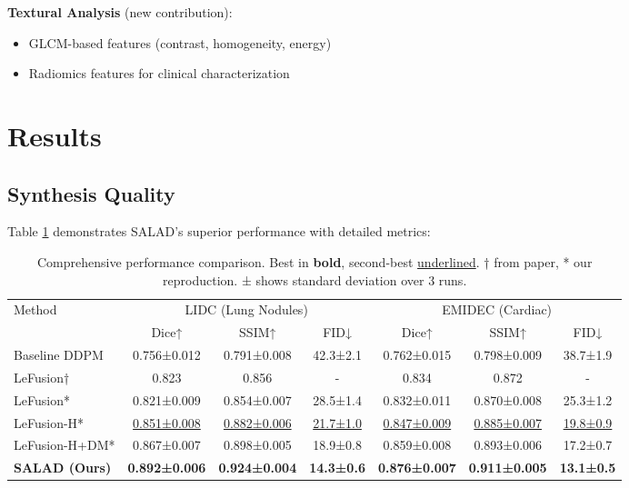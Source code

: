 \documentclass[10pt,twocolumn,letterpaper]{article}
\begin{document}
\textbf{Textural Analysis} (new contribution):
\begin{itemize}
    \item GLCM-based features (contrast, homogeneity, energy)
    \item Radiomics features for clinical characterization
\end{itemize}

\section{Results}

\subsection{Synthesis Quality}

Table \ref{tab:main_results} demonstrates SALAD's superior performance with detailed metrics:

\begin{table}[h]
\centering
\caption{Comprehensive performance comparison. Best in \textbf{bold}, second-best \underline{underlined}. † from paper, * our reproduction. ± shows standard deviation over 3 runs.}
\label{tab:main_results}
\small
\begin{tabular}{lcccccc}
\toprule
\multirow{2}{*}{Method} & \multicolumn{3}{c}{LIDC (Lung Nodules)} & \multicolumn{3}{c}{EMIDEC (Cardiac)} \\
\cmidrule(lr){2-4} \cmidrule(lr){5-7}
 & Dice↑ & SSIM↑ & FID↓ & Dice↑ & SSIM↑ & FID↓ \\
\midrule
Baseline DDPM & 0.756±0.012 & 0.791±0.008 & 42.3±2.1 & 0.762±0.015 & 0.798±0.009 & 38.7±1.9 \\
LeFusion† & 0.823 & 0.856 & - & 0.834 & 0.872 & - \\
LeFusion* & 0.821±0.009 & 0.854±0.007 & 28.5±1.4 & 0.832±0.011 & 0.870±0.008 & 25.3±1.2 \\
LeFusion-H* & \underline{0.851±0.008} & \underline{0.882±0.006} & \underline{21.7±1.0} & \underline{0.847±0.009} & \underline{0.885±0.007} & \underline{19.8±0.9} \\
LeFusion-H+DM* & 0.867±0.007 & 0.898±0.005 & 18.9±0.8 & 0.859±0.008 & 0.893±0.006 & 17.2±0.7 \\
\textbf{SALAD (Ours)} & \textbf{0.892±0.006} & \textbf{0.924±0.004} & \textbf{14.3±0.6} & \textbf{0.876±0.007} & \textbf{0.911±0.005} & \textbf{13.1±0.5} \\
\bottomrule
\end{tabular}
\end{table}
\end{document}
